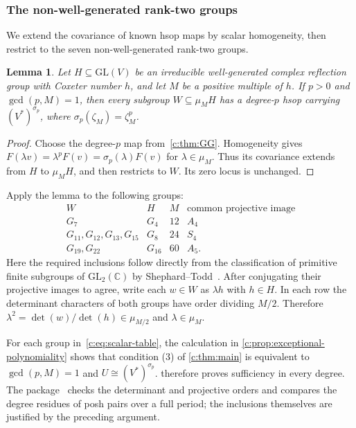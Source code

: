 \documentclass[11pt]{amsart}
\newtheorem{lemma}[theorem]{Lemma}
\theoremstyle{definition}
\newcommand{\C}{\mathbb C}\newcommand{\Q}{\mathbb Q}
\begin{document}
\subsubsection{The non-well-generated rank-two groups}\label{c:sec:scalar}

We extend the covariance of known hsop maps by scalar homogeneity,
then restrict to the seven non-well-generated rank-two groups.

\begin{lemma}\label{c:lem:scalar}
Let $H\subseteq\mathrm{GL}(V)$ be an irreducible well-generated complex
reflection group with Coxeter number $h$, and let $M$ be a positive
multiple of $h$. If $p>0$ and $\gcd(p,M)=1$, then
every subgroup $W\subseteq\mu_M H$ has a degree-$p$ hsop carrying
$(V^*)^{\sigma_p}$, where $\sigma_p(\zeta_M)=\zeta_M^p$.
\end{lemma}

\begin{proof}
Choose the degree-$p$ map from~\cref{c:thm:GG}. Homogeneity gives
$F(\lambda v)=\lambda^pF(v)=\sigma_p(\lambda)F(v)$ for
$\lambda\in\mu_M$. Thus its covariance extends from $H$ to
$\mu_M H$, and then restricts to $W$. Its zero locus is unchanged.
\end{proof}

Apply the lemma to the following groups:
\begin{equation}\label{c:eq:scalar-table}
\begin{array}{c|c|c|c}
 W&H&M&\text{common projective image}\\\hline
 G_7&G_4&12&A_4\\
 G_{11},G_{12},G_{13},G_{15}&G_8&24&S_4\\
 G_{19},G_{22}&G_{16}&60&A_5.
\end{array}
\end{equation}
Here the required inclusions follow directly from the classification of
primitive finite subgroups of $\mathrm{GL}_2(\C)$ by
Shephard--Todd~\cite{ST}. After
conjugating their projective images to agree, write each $w\in W$ as
$\lambda h$ with $h\in H$. In each row the determinant characters of
both groups have order dividing $M/2$. Therefore
$\lambda^2=\det(w)/\det(h)\in\mu_{M/2}$ and $\lambda\in\mu_M$.

For each group in~\cref{c:eq:scalar-table}, the calculation in
\cref{c:prop:exceptional-polynomiality} shows that condition (3) of \cref{c:thm:main}
is equivalent to $\gcd(p,M)=1$ and $U\cong(V^*)^{\sigma_p}$.
 therefore proves sufficiency in every degree.
The package~\cite{Computations} checks the determinant and projective
orders and compares the degree residues of posh pairs over a full period; the
inclusions themselves are justified by the preceding argument.
\end{document}
